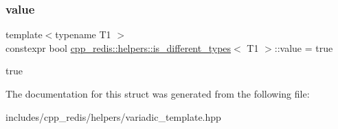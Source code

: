 \subsubsection{\texorpdfstring{value}{value}}
{\footnotesize\ttfamily template$<$typename T1 $>$ \\
constexpr bool \mbox{\hyperlink{structcpp__redis_1_1helpers_1_1is__different__types}{cpp\+\_\+redis\+::helpers\+::is\+\_\+different\+\_\+types}}$<$ T1 $>$\+::value = true\hspace{0.3cm}{\ttfamily [static]}}

true 

The documentation for this struct was generated from the following file\+:\begin{DoxyCompactItemize}
\item 
includes/cpp\+\_\+redis/helpers/variadic\+\_\+template.\+hpp\end{DoxyCompactItemize}
